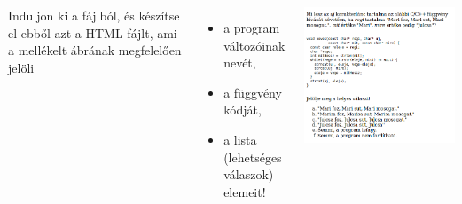 \begin{frame}
  \begin{columns}[c]
      Induljon ki a  fájlból, 
      és készítse el ebből azt a HTML fájlt, ami a mellékelt 
      ábrának megfelelően jelöli
      \begin{itemize}
        \item a program változóinak nevét,
        \item a függvény kódját,
        \item a lista (lehetséges válaszok) elemeit!
      \end{itemize}
      \begin{exampleblock}{}
        \includegraphics[width=\textwidth]{vizsga.png}
      \end{exampleblock}
  \end{columns} 
\end{frame}
